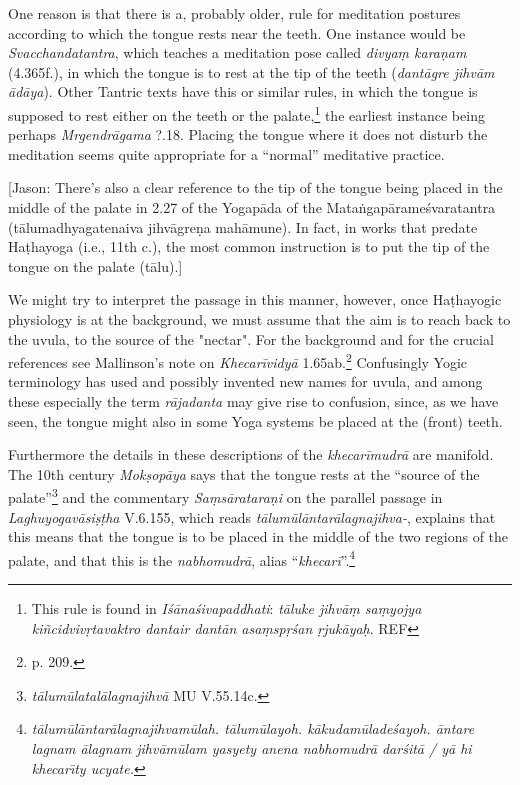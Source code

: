 \begin{ekdosis}
\begin{philcomm}[hp01_045]
One reason is that there is a, probably older, rule for meditation postures according to which the
tongue rests near the teeth. One instance would be \emph{Svacchandatantra}, which teaches a
meditation pose called \emph{divyaṃ karaṇam} (4.365f.), in which the tongue is to rest at the tip
of the teeth (\emph{dantāgre jihvām ādāya}). Other Tantric texts have this or similar rules, in
which the tongue is supposed to rest either on the teeth or the palate,\footnote{This rule is
  found in \emph{Iśānaśivapaddhati}: \emph{tāluke jihvāṃ saṃyojya kiñcidvivṛtavaktro dantair dantān
    asaṃspṛśan ṛjukāyaḥ}. REF} the earliest instance being perhaps \emph{Mrgendrāgama} ?.18.
Placing the tongue where it does not disturb the meditation seems quite appropriate for a
``normal'' meditative practice.

[Jason: There’s also a clear reference to the tip of the tongue being placed in the middle of the palate in 2.27 of the Yogapāda of the Mataṅgapārameśvaratantra (tālumadhyagatenaiva jihvāgreṇa mahāmune). In fact, in works that predate Haṭhayoga (i.e., 11th c.), the most common instruction is to put the tip of the tongue on the palate (tālu).]

We might try to interpret the passage in this manner, however, once Haṭhayogic physiology is at the
background, we must assume that the aim is to reach back to the uvula, to the source of the
"nectar".  For the background and for the crucial references see Mallinson's note on
\emph{Khecarīvidyā} 1.65ab.\footnote{p. 209.}  Confusingly Yogic terminology has used and possibly
invented new names for uvula, and among these especially the term \emph{rājadanta} may give rise to
confusion, since, as we have seen, the tongue might also in some Yoga systems be placed at the
(front) teeth.

Furthermore the details in these descriptions of the \emph{khecarīmudrā} are manifold. The 10th
century \emph{Mokṣopāya} says that the tongue rests at the ``source of the
palate''\footnote{\emph{tālumūlatalālagnajihvā} MU V.55.14c.} and the commentary
\emph{Saṃsārataraṇi} on the parallel passage in \emph{Laghuyogavāsiṣṭha} V.6.155, which reads
\emph{tālumūlāntarālagnajihva-}, explains that this means that the tongue is to be placed in the
middle of the two regions of the palate, and that this is the \emph{nabhomudrā}, alias
``\emph{khecarī}''.\footnote{\emph{tālumūlāntarālagnajihvamūlah. tālumūlayoh. kākudamūladeśayoh. āntare
    lagnam ālagnam jihvāmūlam yasyety anena nabhomudrā darśitā / yā hi khecarı̄ty ucyate.}}


\end{philcomm}
\end{ekdosis}
